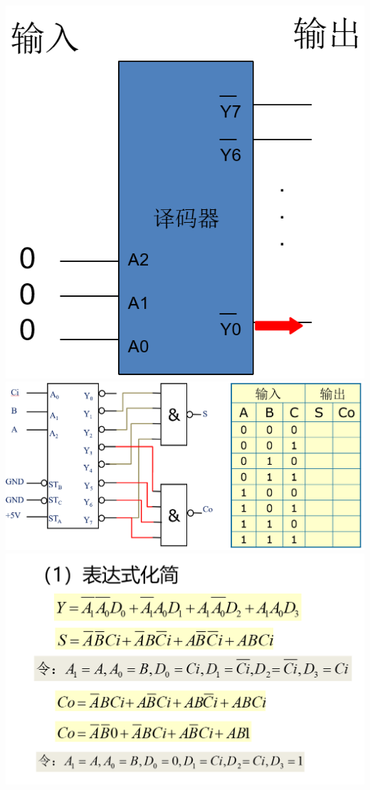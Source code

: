 \documentclass[UTF8]{ctexart}
\begin{document}
\begin{enumerate}
\begin{itemize}
\begin{itemize}
                        \begin{center}
                            \includegraphics[scale=0.4]{7.png}
                            \includegraphics[scale=0.3]{8.png}
                            \includegraphics[scale=0.4]{11.png}

\end{center}
\end{itemize}
\end{itemize}
\end{enumerate}
\end{document}
